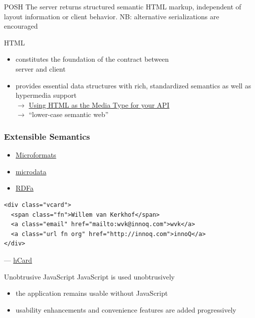\documentclass{beamer}
\begin{document}
\begin{frame}{POSH}
  The server returns structured semantic HTML markup, independent of layout information or client behavior.
  \vspace*{0.25cm}
  NB: alternative serializations are encouraged
\end{frame}

\begin{frame}{HTML}
  \begin{itemize}
    \item constitutes the foundation of the contract between \\ server and client
    \item provides essential data structures with rich, standardized semantics as well as hypermedia support
      \\
      \vspace*{0.25cm}
      \ensuremath{\rightarrow}
      \href{http://codeartisan.blogspot.de/2012/07/using-html-as-media-type-for-your-api.html}{Using HTML as the Media Type for your API}
      \\
      \vspace*{0.25cm}
      \ensuremath{\rightarrow}
      ``lower-case semantic web''
  \end{itemize}
\end{frame}

\begin{frame}[fragile]
  \frametitle{Extensible Semantics}

  \begin{itemize}
    \item \href{http://microformats.org}{Microformats}
    \item \href{http://www.w3.org/TR/microdata/}{microdata}
    \item \href{http://rdfa.info}{RDFa}
  \end{itemize}

  \begin{verbatim}
<div class="vcard">
  <span class="fn">Willem van Kerkhof</span>
  <a class="email" href="mailto:wvk@innoq.com">wvk</a>
  <a class="url fn org" href="http://innoq.com">innoQ</a>
</div>
  \end{verbatim}
  --- \href{http://microformats.org/wiki/hcard}{hCard}

\end{frame}

\begin{frame}{Unobtrusive JavaScript}
  JavaScript is used unobtrusively

  \begin{itemize}
    \item the application remains usable without JavaScript
    \item usability enhancements and convenience features are added progressively
  \end{itemize}
\end{frame}
\end{document}
